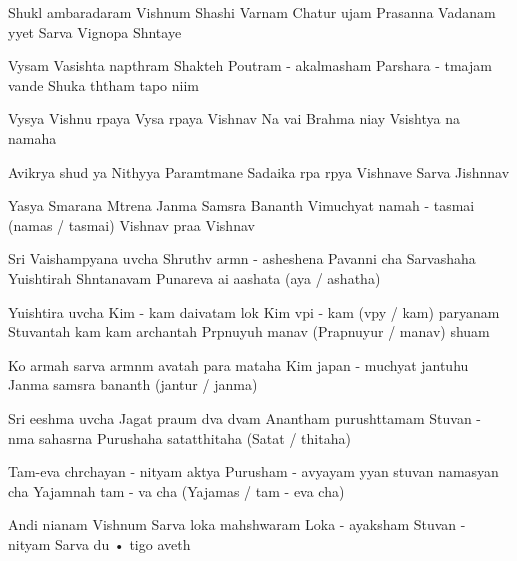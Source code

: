 \documentclass[20pt]{article}
\begin{document}


\SlokaHuge
{Shukl{\A} ambaradaram Vishnum} {Shashi Varnam Chatur {\Bh}ujam}
{Prasanna Vadanam {\Dh}y{\A}yet} {Sarva Vignopa Sh{\A}ntaye}

\phantom{\countr}
\SlokaHuge
{Vy{\A}sam Vasishta napth{\A}ram} {Shakteh Poutram - akalmasham}
{Par{\A}shara - {\A}tmajam vande} {Shuka th{\A}tham tapo ni{\dhh}im}

\SlokaHuge
{Vy{\A}s{\A}ya Vishnu r{\oo}paya} {Vy{\A}sa r{\oo}paya Vishnav{\e}}
{Na{\mo} vai Brahma ni{\dhh}ay{\e}} {V{\aaa}sisht{\A}ya na{\mo} namaha}

\newpage

\SlokaHuge
{Avik{\A}r{\A}ya shud{\dhh} {\A}ya} {Nithy{\A}ya Param{\A}tmane}
{Sadaika r{\oo}pa r{\oo}p{\A}ya} {Vishnave Sarva Jishnnav{\e}}

\SlokaHuge
{Yasya Smarana M{\A}trena} {Janma Sams{\A}ra Ban{\dhh}an{\A}th}
{Vimuchyat{\e} namah - tasmai (namas / tasmai)} {Vishnav{\e} pra{\bh}a Vishnav{\e}}


\SlokaHeaderHuge
{Sri Vaishamp{\A}yana uv{\A}cha}
{Shruthv{\A} {\Dh}arm{\A}n - asheshena} {Pavan{\A}ni cha Sarvashaha}
{Yu{\dhh}ishtirah Sh{\A}ntanavam} {Punareva \dsh a{\bh}i \dsh a{\bh}ashata (a{\bh}ya / {\bh}ashatha)}

\newpage

\SlokaHeaderHuge
 {Yu{\dhh}ishtira uv{\A}cha}
{Kim - {\e}kam daivatam lok{\e}} {Kim v{\A}pi - {\e}kam (v{\A}py{\e} / kam) par{\A}yanam}
{Stuvantah kam kam \dsh archantah} {Pr{\A}pnuyuh \dsh manav{\ah} (Prapnuyur / manav{\ah}) shu{\bh}am}

\SlokaHuge
{Ko {\Dh}armah sarva {\Dh}arm{\A}n{\aaa}m} {{\bh}avatah para{\mo} mataha}
{Kim japan - muchyat{\e} jantuhu} {Janma sams{\A}ra ban{\dhh}an{\A}th (jantur / janma)}

\SlokaHeaderHuge
{Sri {\Bh}eeshma uv{\A}cha}
{Jagat pra{\bh}um d{\e}va d{\e}vam} {Anantham purush{\oh}ttamam}
{Stuvan - n{\A}ma sahasr{\e}na} {Purushaha satat{\oh}thitaha (Satat{\oh} / thitaha)}

\newpage

\SlokaHuge
{Tam-eva ch{\aaa}rchayan - nityam} {{\Bh}aktya Purusham - avyayam}
{{\Dh}y{\A}yan stuvan namasyan \dsh cha} {Yajam{\aaa}nah tam - {\e}va cha (Yajam{\an}as / tam - eva cha)}

\SlokaHuge
{An{\aaa}di ni{\dhh}anam Vishnum} {Sarva loka mah{\e}shwaram}
{Loka - a{\dhh}yaksham Stuvan - nityam} {Sarva du {•} {\A}tigo {\bh}aveth}
\end{document}
